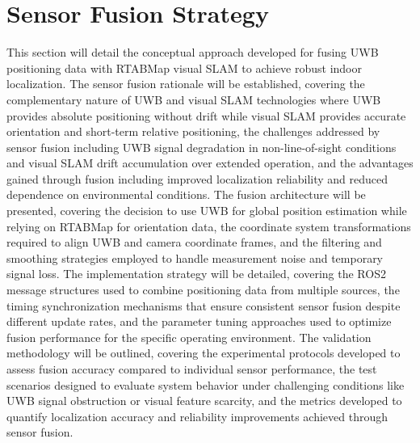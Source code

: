 \section{Sensor Fusion Strategy}
This section will detail the conceptual approach developed for fusing UWB positioning data with RTABMap visual SLAM to achieve robust indoor localization. The sensor fusion rationale will be established, covering the complementary nature of UWB and visual SLAM technologies where UWB provides absolute positioning without drift while visual SLAM provides accurate orientation and short-term relative positioning, the challenges addressed by sensor fusion including UWB signal degradation in non-line-of-sight conditions and visual SLAM drift accumulation over extended operation, and the advantages gained through fusion including improved localization reliability and reduced dependence on environmental conditions. The fusion architecture will be presented, covering the decision to use UWB for global position estimation while relying on RTABMap for orientation data, the coordinate system transformations required to align UWB and camera coordinate frames, and the filtering and smoothing strategies employed to handle measurement noise and temporary signal loss. The implementation strategy will be detailed, covering the ROS2 message structures used to combine positioning data from multiple sources, the timing synchronization mechanisms that ensure consistent sensor fusion despite different update rates, and the parameter tuning approaches used to optimize fusion performance for the specific operating environment. The validation methodology will be outlined, covering the experimental protocols developed to assess fusion accuracy compared to individual sensor performance, the test scenarios designed to evaluate system behavior under challenging conditions like UWB signal obstruction or visual feature scarcity, and the metrics developed to quantify localization accuracy and reliability improvements achieved through sensor fusion.

